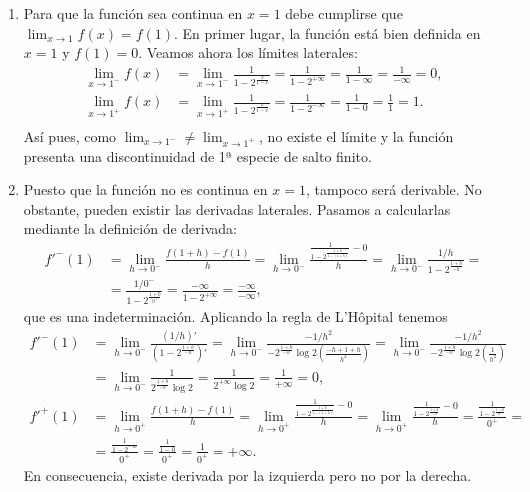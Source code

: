 {
\begin{enumerate}
\item Para que la función sea continua en $x=1$ debe cumplirse que $\lim_{x\rightarrow 1}f(x)=f(1)$. En primer lugar, la función está bien definida en $x=1$ y $f(1)=0$. Veamos ahora los límites laterales:
\begin{align*}
\lim_{x\rightarrow 1^-} f(x) &= \lim_{x\rightarrow 1^-} \frac{1}{1-2^{\frac{x}{1-x}}} = \frac{1}{1-2^{+\infty}}= \frac{1}{1-\infty}=\frac{1}{-\infty}=0,\\
\lim_{x\rightarrow 1^+} f(x) &= \lim_{x\rightarrow 1^+} \frac{1}{1-2^{\frac{x}{1-x}}} = \frac{1}{1-2^{-\infty}}= \frac{1}{1-0}=\frac{1}{1}=1.\\
\end{align*}
Así pues, como $\lim_{x\rightarrow 1^-}\neq \lim_{x\rightarrow 1^+}$, no existe el límite y la función presenta una discontinuidad de 1ª especie de salto finito.

\item Puesto que la función no es continua en $x=1$, tampoco será derivable. No obstante, pueden existir las derivadas laterales. Pasamos a calcularlas mediante la definición de derivada:
\begin{align*}
f'^-(1)&= \lim_{h\rightarrow 0^-}\frac{f(1+h)-f(1)}{h}= \lim_{h\rightarrow 0^-}\frac{\frac{1}{1-2^{\frac{1+h}{1-(1+h)}}}-0}{h} =  \lim_{h\rightarrow 0^-}\frac{1/h}{1-2^{\frac{1+h}{-h}}}=\\
&= \frac{1/0^-}{1-2^{\frac{1+0}{0^+}}} =\frac{-\infty}{1-2^{+\infty}} =\frac{-\infty}{-\infty},
\end{align*}
que es una indeterminación. Aplicando la regla de L'Hôpital tenemos
\begin{align*}
f'^-(1)&= \lim_{h\rightarrow 0^-}\frac{(1/h)'}{\left(1-2^{\frac{1+h}{-h}}\right)'} = \lim_{h\rightarrow 0^-}\frac{-1/h^2}{-2^{\frac{1+h}{-h}}\log 2 \left(\frac{-h+1+h}{h^2}\right)} = \lim_{h\rightarrow 0^-}\frac{-1/h^2}{-2^{\frac{1+h}{-h}}\log 2 \left(\frac{1}{h^2}\right)} \\
&= \lim_{h\rightarrow 0^-}\frac{1}{2^{\frac{1+h}{-h}}\log 2 } =\frac{1}{2^{+\infty}\log 2}=\frac{1}{+\infty}=0,\\
f'^+(1)&= \lim_{h\rightarrow 0^+}\frac{f(1+h)-f(1)}{h}= 
\lim_{h\rightarrow 0^+}\frac{\frac{1}{1-2^{\frac{1+h}{1-(1+h)}}}-0}{h} =
\lim_{h\rightarrow 0^+}\frac{\frac{1}{1-2^{\frac{1+h}{-h}}}-0}{h} = 
\frac{\frac{1}{1-2^{\frac{1+0}{0^-}}}}{0^+} = \\
&= \frac{\frac{1}{1-2^{-\infty}}}{0^+} =
\frac{\frac{1}{1-0}}{0^+}=\frac{1}{0^+}=+\infty.
\end{align*}
En consecuencia, existe derivada por la izquierda pero no por la derecha.
\end{enumerate}
}


